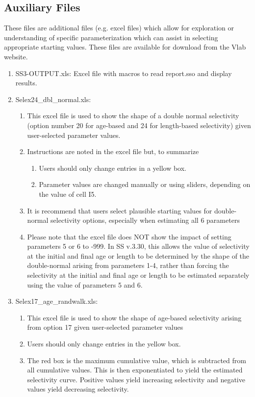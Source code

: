 	\subsection{Auxiliary Files}
	These files are additional files (e.g. excel files) which allow for exploration or understanding of specific parameterization which can assist in selecting appropriate starting values.  These files are available for download from the Vlab website. 
	\begin{enumerate}
		\item SS3-OUTPUT.xls: Excel file with macros to read report.sso and display results.
		\item Selex24\_dbl\_normal.xls:
		\begin{enumerate}
			\item This excel file is used to show the shape of a double normal selectivity (option number 20 for age-based and 24 for length-based selectivity) given user-selected parameter values.
			\item Instructions are noted in the excel file but, to summarize
			\begin{enumerate}
				\item Users should only change entries in a yellow box. 
				\item Parameter values are changed manually or using sliders, depending on the value of cell I5.
			\end{enumerate}
			\item It is recommend that users select plausible starting values for double-normal selectivity options, especially when estimating all 6 parameters
			\item Please note that the excel file does NOT show the impact of setting parameters 5 or 6 to -999.  In SS v.3.30, this allows the value of selectivity at the initial and final age or length to be determined by the shape of the double-normal arising from parameters 1-4, rather than forcing the selectivity at the initial and final age or length to be estimated separately using the value of parameters 5 and 6. 
		\end{enumerate}
		\item Selex17\_age\_randwalk.xls:
		\begin{enumerate}
			\item This excel file is used to show the shape of age-based selectivity arising from option 17 given user-selected parameter values
			\item Users should only change entries in the yellow box.
			\item The red box is the maximum cumulative value, which is subtracted from all cumulative values.  This is then exponentiated to yield the estimated selectivity curve.  Positive values yield increasing selectivity and negative values yield decreasing selectivity.

\end{enumerate}
\end{enumerate}
